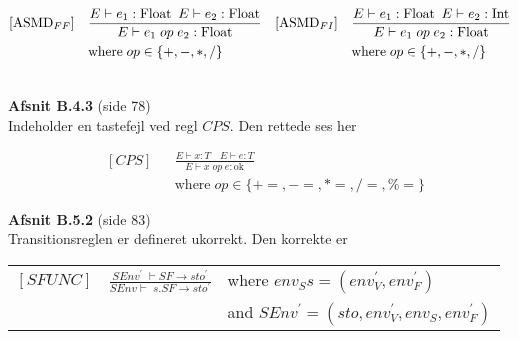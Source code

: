 \documentclass[a4paper,11pt,twoside]{report}
\begin{document}
\begin{align*}
&[\text{ASMD}_{FF}]           &  &\frac{E \vdash e_1 : \text{Float} \enskip E \vdash e_2 : \text{Float}}{E \vdash e_1\; op \;e_2 : \text{Float}} & &[\text{ASMD}_{FI}]           &  &\frac{E \vdash e_1 : \text{Float} \enskip E \vdash e_2 : \text{Int}}{E \vdash e_1\; op \;e_2 : \text{Float}}\\    
& & &\text{where}\; op \in \{+, -, *, /\} & & & &\text{where}\; op \in \{+, -, *, /\}\\\\
\end{align*}

\noindent \textbf{Afsnit B.4.3} (side 78)\\
\noindent Indeholder en tastefejl ved regl $CPS$. Den rettede ses her

\begin{align*}
&[CPS] & &\frac{E \vdash x : T\quad E \vdash e : T}{E \vdash x\; op\; e : \text{ok}}\\
& & &\text{where}\; op \in \{+=, -=, *=, /=, \%=\}
\end{align*}

\noindent \textbf{Afsnit B.5.2} (side 83)\\
\noindent Transitionsreglen er defineret ukorrekt. Den korrekte er

\begin{table}[H]
\centering
\begin{tabular}{lll}
$[SFUNC]$ & $\frac{SEnv^\prime\; \vdash SF \rightarrow sto^\prime}{SEnv \vdash\; s.SF \rightarrow sto^\prime}$ & where $env_S s = (env_V^\prime, env_F^\prime)$\\
& & and $SEnv^\prime = (sto, env_V^\prime, env_S, env_F^\prime)$
\end{tabular}
\end{table}
\end{document}
